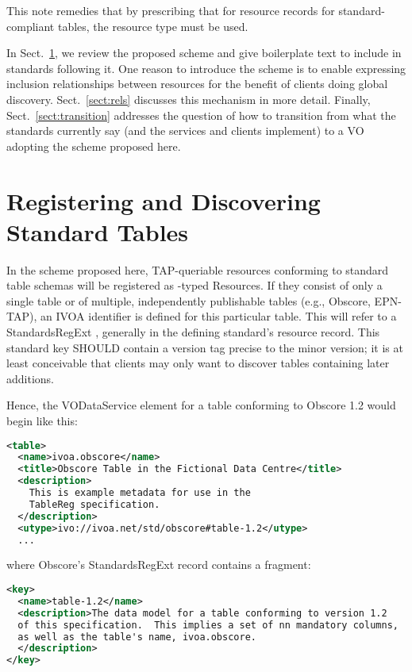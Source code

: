 \documentclass[11pt,a4paper]{ivoa}
\begin{document}
This note remedies that by prescribing that for resource records for
standard-compliant tables, the resource type 
must be used.

In Sect.~\ref{sect:norms}, we review the proposed scheme and give
boilerplate text to include in standards following it.  One reason to
introduce the scheme is to enable expressing inclusion relationships
between resources for the benefit of clients doing global discovery.
Sect.~\ref{sect:rels} discusses this mechanism in more detail.  Finally,
Sect.~\ref{sect:transition} addresses the question of how to transition
from what the standards currently say (and the services and clients
implement) to a VO adopting the scheme proposed here.

\section{Registering and Discovering Standard Tables}
\label{sect:norms}

In the scheme proposed here, TAP-queriable resources conforming to
standard table schemas will be registered as
-typed Resources.  If they consist of only a
single table or of multiple, independently publishable tables (e.g.,
Obscore, EPN-TAP), an IVOA identifier \citep{2016ivoa.spec.0523D} is
defined for this particular table.  This will refer to a StandardsRegExt
\citep{2012ivoa.spec.0508H} , generally in the
defining standard's resource record.  This standard key SHOULD contain a
version tag precise to the minor version; it is at least conceivable
that clients may only want to discover tables containing later
additions.

Hence, the VODataService  element for a table conforming to
Obscore 1.2 would begin like this:
\begin{lstlisting}[language=XML]
<table>
  <name>ivoa.obscore</name>
  <title>Obscore Table in the Fictional Data Centre</title>
  <description>
    This is example metadata for use in the
    TableReg specification.
  </description>
  <utype>ivo://ivoa.net/std/obscore#table-1.2</utype>
  ...
\end{lstlisting}
where Obscore's StandardsRegExt record contains a fragment:
\begin{lstlisting}[language=XML]
<key>
  <name>table-1.2</name>
  <description>The data model for a table conforming to version 1.2
  of this specification.  This implies a set of nn mandatory columns,
  as well as the table's name, ivoa.obscore.
  </description>
</key>
\end{lstlisting}
\end{document}
